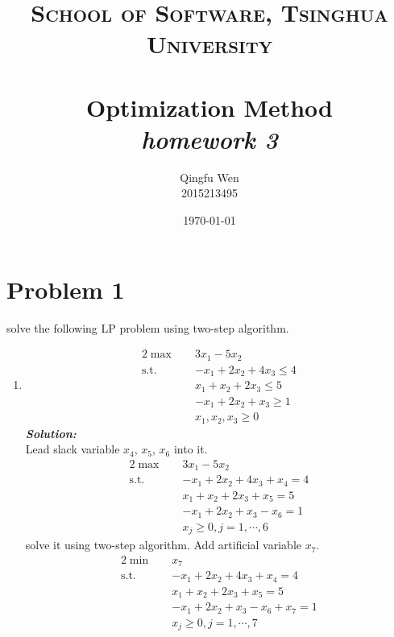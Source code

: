 \documentclass[paper=a4, fontsize=11pt]{scrartcl} %
\title{	
\normalfont \normalsize
\textsc{School of Software, Tsinghua University} \\ [25pt] %
\horrule{0.5pt} \\[0.4cm] %
\huge Optimization Method\\ %
\LARGE\textit{homework 3}
\horrule{2pt} \\[0.5cm] %
}
\author{Qingfu Wen \\ \normalsize 2015213495} %
\date{\normalsize\today} %
\numberwithin{equation}{section} %
\numberwithin{figure}{section} %
\numberwithin{table}{section} %
\begin{document}
\maketitle %
\tableofcontents
\newpage

\section{Problem 1}
solve the following LP problem using two-step algorithm.
\begin{enumerate}
\item
\begin{alignat}{2}          \nonumber
\max\quad & 3x_1-5x_2 \\    \nonumber
\mbox{s.t.}\quad            \nonumber
& -x_1+2x_2+4x_3 \leq 4\\        \nonumber
& x_1+x_2+2x_3 \leq 5\\         \nonumber
& -x_1+2x_2+x_3 \geq 1\\          \nonumber
& x_1,x_2,x_3 \geq 0
\end{alignat}
\emph{\textbf{Solution:}}\\

Lead slack variable $x_4$, $x_5$, $x_6$ into it.
\begin{alignat}{2}          \nonumber
\max\quad & 3x_1-5x_2 \\    \nonumber
\mbox{s.t.}\quad            \nonumber
& -x_1+2x_2+4x_3+x_4=4\\        \nonumber
& x_1+x_2+2x_3 +x_5=5\\         \nonumber
& -x_1+2x_2+x_3-x_6= 1\\          \nonumber
& x_j\geq 0, j=1,\cdots,6
\end{alignat}
solve it using two-step algorithm. Add artificial variable $x_7$.\\
\begin{alignat}{2}          \nonumber
\min\quad & x_7 \\    \nonumber
\mbox{s.t.}\quad            \nonumber
& -x_1+2x_2+4x_3+x_4=4\\        \nonumber
& x_1+x_2+2x_3 +x_5=5\\         \nonumber
& -x_1+2x_2+x_3-x_6+x_7= 1\\          \nonumber
& x_j\geq 0, j=1,\cdots,7
\end{alignat}


\end{enumerate}
\end{document}
